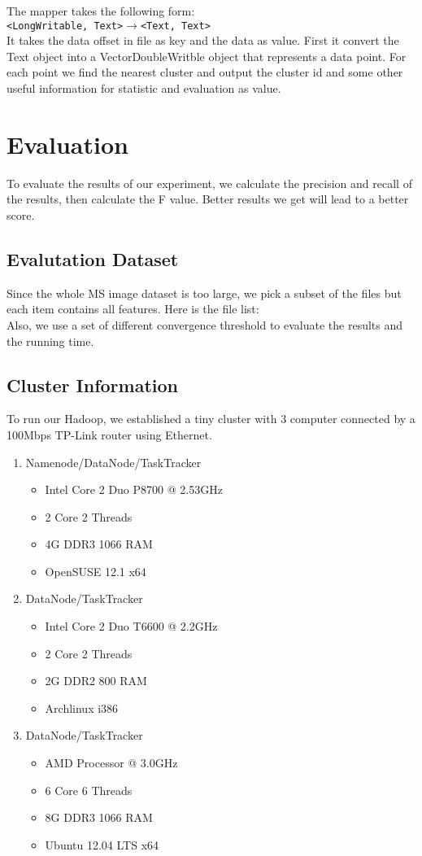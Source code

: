 \documentclass[a4paper,11pt]{article}
\begin{document}
The mapper takes the following form:\\
\verb|<LongWritable, Text>|$\rightarrow$\verb|<Text, Text>|\\
It takes the data offset in file as key and the data as value. First it convert
the Text object into a VectorDoubleWritble object that represents a data point.
For each point we find the nearest cluster and output the cluster id and some
other useful information for statistic and evaluation as value.

\section{Evaluation}
To evaluate the results of our experiment, we calculate the precision and 
recall of the results, then calculate the F value. Better results we get will 
lead to a better score.

\subsection{Evalutation Dataset}
Since the whole MS image dataset is too large, we pick a subset of the files 
but each item contains all features. Here is the file list:\\

Also, we use a set of different convergence threshold to evaluate the results
and the running time.
\subsection{Cluster Information}
To run our Hadoop, we established a tiny cluster with 3 computer connected by 
a 100Mbps TP-Link router using Ethernet.
\begin{enumerate}
  \item Namenode/DataNode/TaskTracker
  \begin{itemize}
    \item Intel Core 2 Duo P8700 @ 2.53GHz
    \item 2 Core 2 Threads
    \item 4G DDR3 1066 RAM
    \item OpenSUSE 12.1 x64
  \end{itemize}
  \item DataNode/TaskTracker
  \begin{itemize}
    \item Intel Core 2 Duo T6600 @ 2.2GHz
    \item 2 Core 2 Threads
    \item 2G DDR2 800 RAM
    \item Archlinux i386
  \end{itemize}
  \item DataNode/TaskTracker
  \begin{itemize}
    \item AMD Processor @ 3.0GHz 
    \item 6 Core 6 Threads
    \item 8G DDR3 1066 RAM
    \item Ubuntu 12.04 LTS x64
  \end{itemize}
\end{enumerate}
\end{document}
